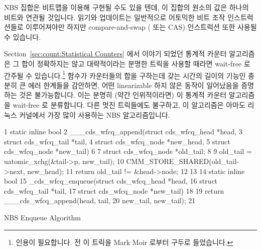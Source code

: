 NBS 집합은 비트맵을 이용해 구현될 수도 있을 텐데, 이 집합의 원소의 값은 하나의
비트와 연관될 것입니다.
읽기와 업데이트는 일반적으로 어토믹한 비트 조작 인스트럭션들로 이루어져야만
하지만 compare-and-swap ( 또는 CAS) 인스트럭션 또한 사용될 수
있습니다.

Section~\ref{sec:count:Statistical Counters} 에서 이야기 되었던 통계적 카운터
알고리즘은 그 합이 정확하지는 않고 대략적이라는 분명한 트릭을 사용할 때라면
wait-free 로 간주될 수 있습니다.\footnote{
	인용이 필요합니다.
	전 이 트릭을 Mark Moir 로부터 구두로 들었습니다.}
 함수가 카운터들의 합을 구하는데 갖는 시간의 길이의 기능인
충분히 큰 에러 한계들을 감안하면, 어떤 linearizable 하지 않은 동작이 일어났음을
증명하는 것은 불가능합니다.
이는 분명히 (약간 인위적이라면) 이 통계적 카운터 알고리즘을 wait-free 로
분류합니다.
다른 멋진 트릭들에도 불구하고, 이 알고리즘은 아마도 리눅스 커널에서 가장 많이
사용하는 NBS 알고리즘입니다.
\iffalse

An NBS set may also be implemented using a bitmap, where each value that
might be a member of the set corresponds to one bit.
Reads and updates must normally be carried out via atomic bit-manipulation
instructions, although compare-and-swap (\co{cmpxchg()} or CAS)
instructions can also be used.

The statistical counters algorithm discussed in
Section~\ref{sec:count:Statistical Counters}
can be considered wait-free, but only but using a cute definitional trick
in which the sum is considered approximate rather than exact.\footnote{
	Citation needed.
	I heard of this trick verbally from Mark Moir.}
Given sufficiently wide error bounds that are a function of the length
of time that the \co{read_count()} function takes to sum the counters,
it is not possible to prove that any non-linearizable behavior occurred.
This definitely (if a bit artificially) classifies the statistical-counters
algorithm as wait-free.
Cute definitional tricks notwithstanding, this algorithm is probably
the most heavily used NBS algorithm in the Linux kernel.
\fi

\begin{listing}[tbp]
{ \scriptsize
\begin{verbbox}
 1 static inline bool
 2 ___cds_wfcq_append(struct cds_wfcq_head *head,
 3                    struct cds_wfcq_tail *tail,
 4                    struct cds_wfcq_node *new_head,
 5                    struct cds_wfcq_node *new_tail)
 6 {
 7   struct cds_wfcq_node *old_tail;
 8 
 9   old_tail = uatomic_xchg(&tail->p, new_tail);
10   CMM_STORE_SHARED(old_tail->next, new_head);
11   return old_tail != &head->node;
12 }
13 
14 static inline bool
15 _cds_wfcq_enqueue(struct cds_wfcq_head *head,
16                   struct cds_wfcq_tail *tail,
17                   struct cds_wfcq_node *new_tail)
18 {
19   return ___cds_wfcq_append(head, tail,
20                             new_tail, new_tail);
21 }
\end{verbbox}
}
\centering
\theverbbox
\caption{NBS Enqueue Algorithm}
\label{lst:count:NBS Enqueue Algorithm}
\end{listing}

